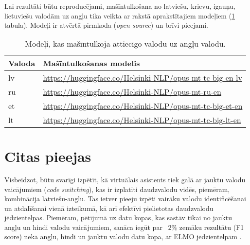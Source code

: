 Lai rezultāti būtu reproducējami, mašīntulkošana no latviešu, krievu, igauņu, lietuviešu valodām uz angļu tika veikta ar \cite{tiedemann-2020} rakstā aprakstītajiem modeļiem (\ref{tab:machine-translation} tabula). Modeļi ir atvērtā pirmkoda (\textit{open source}) un brīvi pieejami.



\begin{table}[htbp]
  \centering
  \caption{Modeļi, kas mašīntulkoja attiecīgo valodu uz angļu valodu.}
    \begin{tabular}{ll}\toprule
    Valoda & Mašīntulkošanas modelis \\\midrule
    lv    & \url{https://huggingface.co/Helsinki-NLP/opus-mt-tc-big-en-lv} \\
    ru    & \url{https://huggingface.co/Helsinki-NLP/opus-mt-ru-en} \\
    et    & \url{https://huggingface.co/Helsinki-NLP/opus-mt-tc-big-et-en} \\
    lt    & \url{https://huggingface.co/Helsinki-NLP/opus-mt-tc-big-lt-en} \\\bottomrule
    \end{tabular}%
  \label{tab:machine-translation}%
\end{table}%



\section{Citas pieejas}

Visbeidzot, būtu svarīgi izpētīt, kā virtuālais asistents tiek galā ar jauktu valodu vaicājumiem (\textit{code switching}), kas ir izplatīti daudzvalodu vidēs, piemēram, kombinācija latviešu-angļu. Tas ietver pieeju izpēti vairāku valodu identificēšanai un atdalīšanai vienā izteikumā, kā arī efektīvi pielietotas daudzvalodu jēdzientelpas. Piemēram, pētījumā uz datu kopas, kas sastāv tikai no jauktu angļu un hindi valodu vaicājumiem, sanāca iegūt par ~2\% zemāku rezultātu (F1 score) nekā angļu, hindi un jauktu valodu datu kopa, ar ELMO jēdzientelpām \cite{jayarao2018}.

